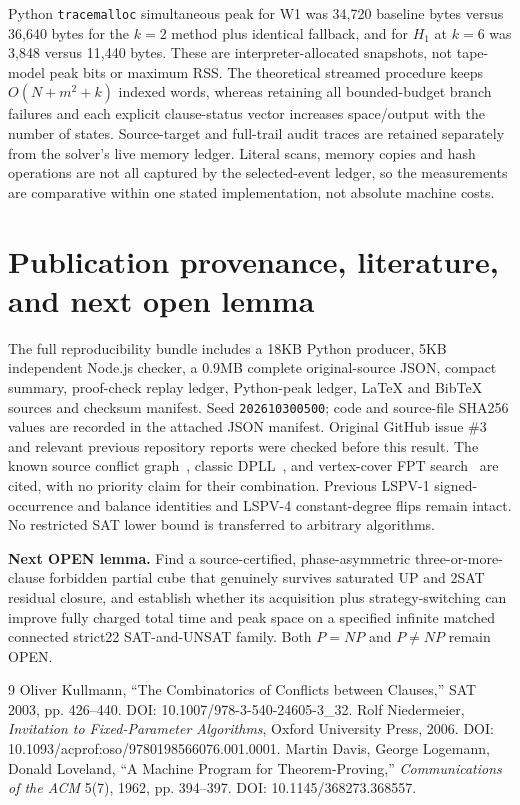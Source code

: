 \documentclass[10pt]{article}
\begin{document}
\noindent Python \texttt{tracemalloc} simultaneous peak for W1 was 34,720 baseline bytes versus 36,640 bytes for the $k=2$ method plus identical fallback, and for $H_1$ at $k=6$ was 3,848 versus 11,440 bytes. These are interpreter-allocated snapshots, not tape-model peak bits or maximum RSS. The theoretical streamed procedure keeps $O(N+m^2+k)$ indexed words, whereas retaining all bounded-budget branch failures and each explicit clause-status vector increases space/output with the number of states. Source-target and full-trail audit traces are retained separately from the solver's live memory ledger. Literal scans, memory copies and hash operations are not all captured by the selected-event ledger, so the measurements are comparative within one stated implementation, not absolute machine costs.

\section{Publication provenance, literature, and next open lemma}
The full reproducibility bundle includes a 18KB Python producer, 5KB independent Node.js checker, a 0.9MB complete original-source JSON, compact summary, proof-check replay ledger, Python-peak ledger, LaTeX and BibTeX sources and checksum manifest. Seed \texttt{202610300500}; code and source-file SHA256 values are recorded in the attached JSON manifest. Original GitHub issue \#3 and relevant previous repository reports were checked before this result. The known source conflict graph~\cite{Kullmann2003}, classic DPLL~\cite{Davis1962}, and vertex-cover FPT search~\cite{Niedermeier2006} are cited, with no priority claim for their combination. Previous LSPV-1 signed-occurrence and balance identities and LSPV-4 constant-degree flips remain intact. No restricted SAT lower bound is transferred to arbitrary algorithms.

\noindent\textbf{Next OPEN lemma.} Find a source-certified, phase-asymmetric three-or-more-clause forbidden partial cube that genuinely survives saturated UP and 2SAT residual closure, and establish whether its acquisition plus strategy-switching can improve fully charged total time and peak space on a specified infinite matched connected strict22 SAT-and-UNSAT family. Both $P=NP$ and $P\ne NP$ remain OPEN.
\begin{thebibliography}{9}
 Oliver Kullmann, ``The Combinatorics of Conflicts between Clauses,'' SAT 2003, pp. 426--440. DOI: 10.1007/978-3-540-24605-3\_32.
 Rolf Niedermeier, \emph{Invitation to Fixed-Parameter Algorithms}, Oxford University Press, 2006. DOI: 10.1093/acprof:oso/9780198566076.001.0001.
 Martin Davis, George Logemann, Donald Loveland, ``A Machine Program for Theorem-Proving,'' \emph{Communications of the ACM} 5(7), 1962, pp. 394--397. DOI: 10.1145/368273.368557.
\end{thebibliography}
\end{document}
